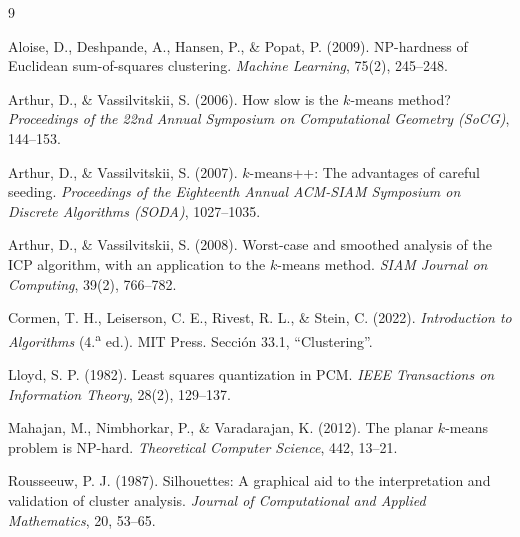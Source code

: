 \documentclass[11pt,letterpaper]{article}
\numberwithin{equation}{section}
\theoremstyle{plain}
\begin{document}
\begin{thebibliography}{9}
\small
\setlength{\itemsep}{0.45em}

Aloise, D., Deshpande, A., Hansen, P., \& Popat, P. (2009). NP-hardness of Euclidean sum-of-squares clustering. \textit{Machine Learning}, 75(2), 245--248.

Arthur, D., \& Vassilvitskii, S. (2006). How slow is the $k$-means method? \textit{Proceedings of the 22nd Annual Symposium on Computational Geometry (SoCG)}, 144--153.

Arthur, D., \& Vassilvitskii, S. (2007). $k$-means++: The advantages of careful seeding. \textit{Proceedings of the Eighteenth Annual ACM-SIAM Symposium on Discrete Algorithms (SODA)}, 1027--1035.

Arthur, D., \& Vassilvitskii, S. (2008). Worst-case and smoothed analysis of the ICP algorithm, with an application to the $k$-means method. \textit{SIAM Journal on Computing}, 39(2), 766--782.

Cormen, T. H., Leiserson, C. E., Rivest, R. L., \& Stein, C. (2022). \textit{Introduction to Algorithms} (4.\textsuperscript{a} ed.). MIT Press. Sección 33.1, ``Clustering''.

Lloyd, S. P. (1982). Least squares quantization in PCM. \textit{IEEE Transactions on Information Theory}, 28(2), 129--137.

Mahajan, M., Nimbhorkar, P., \& Varadarajan, K. (2012). The planar $k$-means problem is NP-hard. \textit{Theoretical Computer Science}, 442, 13--21.

Rousseeuw, P. J. (1987). Silhouettes: A graphical aid to the interpretation and validation of cluster analysis. \textit{Journal of Computational and Applied Mathematics}, 20, 53--65.

\end{thebibliography}
\end{document}
